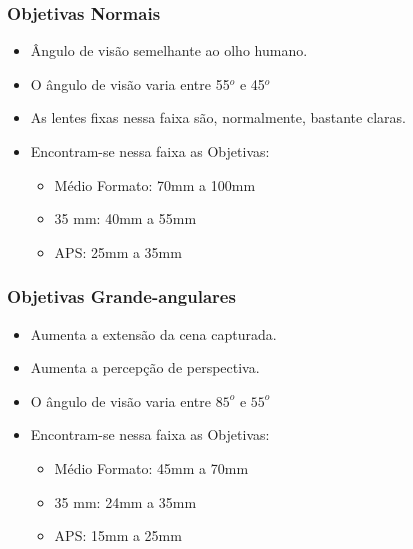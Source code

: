 

\begin{frame}
    \frametitle{Objetivas Normais}
    \begin{itemize}
        \item Ângulo de visão semelhante ao olho humano.
        \item O ângulo de visão varia entre 55$^o$ e 45$^o$
        \item As lentes fixas nessa faixa são, normalmente, bastante claras.
        \item Encontram-se nessa faixa as Objetivas:

        {\small \begin{itemize}
            \item Médio Formato: 70mm a 100mm
            \item 35 mm: 40mm a 55mm
            \item APS: 25mm a 35mm
        \end{itemize}}
    \end{itemize}
\end{frame}

\begin{frame}
    \frametitle{Objetivas Grande-angulares}
    \begin{itemize}
        \item Aumenta a extensão da cena capturada.
        \item Aumenta a percepção de perspectiva.
        \item O ângulo de visão varia entre $85^o$ e $55^o$
        \item Encontram-se nessa faixa as Objetivas:

        {\small \begin{itemize}
            \item Médio Formato: 45mm a 70mm
            \item 35 mm: 24mm a 35mm
            \item APS: 15mm a 25mm
        \end{itemize}}
    \end{itemize}
\end{frame}


